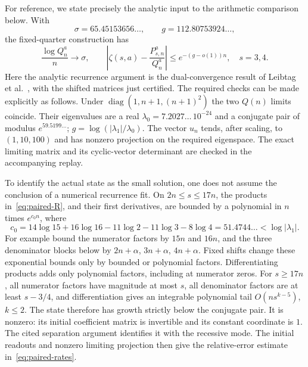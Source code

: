 For reference, we state precisely the analytic input to the arithmetic
comparison below. With
\[
 \sigma=65.45153656\ldots,\qquad g=112.80753924\ldots,
\]
the fixed-quarter construction has
\begin{equation}\label{eq:paired-rates}
 \frac{\log Q_n^a}{n}\longrightarrow\sigma,\qquad
 \left|\zeta(s,a)-\frac{P_{s,n}^a}{Q_n^a}\right|
               \leq e^{-(g-o(1))n},\quad s=3,4.
\end{equation}
Here the analytic recurrence argument is the dual-convergence result
of Leibtag et al.~\cite[Theorem 2.6, Corollary 2.7 and Appendix B.1]{Leibtag},
with the shifted matrices just certified. The required checks can be
made explicitly as follows. Under $\operatorname{diag}(1,n+1,(n+1)^2)$
the two $Q(n)$ limits coincide. Their eigenvalues are a real
$\lambda_0=7.2027\ldots\,10^{-24}$ and a conjugate pair of modulus
$e^{59.5199\ldots}$; $g=\log(|\lambda_1|/\lambda_0)$.
The vector $u_n$ tends, after scaling, to $(1,10,100)$ and has
nonzero projection on the required eigenspace. The exact limiting
matrix and its cyclic-vector determinant are checked in the accompanying
 replay.

To identify the actual state as the small solution, one does not
assume the conclusion of a numerical recurrence fit. On $2n\leq s\leq17n$,
the products in~\eqref{eq:paired-R}, and their first derivatives,
are bounded by a polynomial in $n$ times $e^{c_0n}$, where
\[
 c_0=14\log15+16\log16-11\log2-11\log3-8\log4
          =51.4744\ldots<\log|\lambda_1|.
\]
For example bound the numerator factors by $15n$ and $16n$, and
the three denominator blocks below by $2n+\alpha$, $3n+\alpha$,
$4n+\alpha$. Fixed shifts change these exponential bounds only by
bounded or polynomial factors. Differentiating products adds only
polynomial factors, including at numerator zeros. For $s\geq17n$,
all numerator factors have magnitude at most $s$, all denominator
factors are at least $s-3/4$, and differentiation gives an integrable
polynomial tail $O(n s^{k-5})$, $k\leq2$. The state therefore has
growth strictly below the conjugate pair. It is nonzero: its initial
coefficient matrix is invertible and its constant coordinate is $1$.
The cited separation argument identifies it with the recessive mode.
The initial readouts and nonzero limiting projection then give the
relative-error estimate in~\eqref{eq:paired-rates}.

